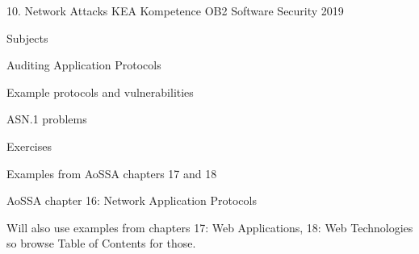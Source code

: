 \documentclass[Screen16to9,17pt]{foils}
\begin{document}
\mytitlepage
{10. Network Attacks}
{KEA Kompetence OB2 Software Security 2019}


\begin{list1}
\item Subjects
\begin{list2}
\item Auditing Application Protocols
\item Example protocols and vulnerabilities
\item ASN.1 problems
\end{list2}
\item Exercises
\begin{list2}
\item Examples from AoSSA chapters 17 and 18
\end{list2}
\end{list1}


\begin{list1}
\item AoSSA chapter 16: Network Application Protocols
\item Will also use examples from chapters 17: Web Applications, 18: Web Technologies so browse Table of Contents for those.
\end{list1}



\begin{list1}
\item
\end{list1}


\end{document}

